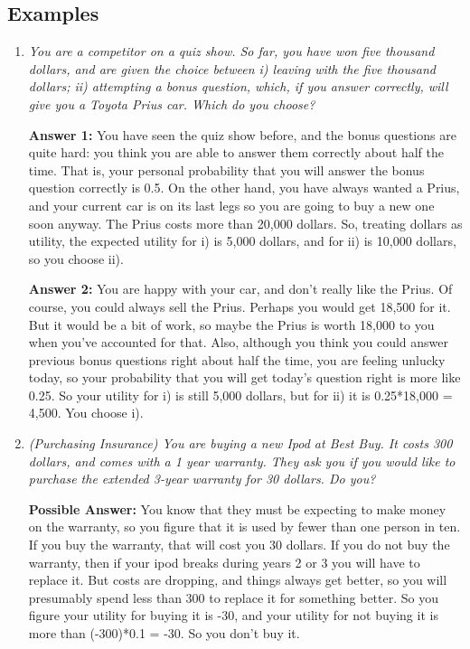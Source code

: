 \documentclass[12pt]{article}
\begin{document}
\subsection{Examples}

\bigskip
\begin{enumerate}

\item {\it You are a competitor on a quiz show. So far, you have won five thousand dollars, and are given the choice between i) leaving with the five thousand dollars; ii) attempting a bonus question, which, if you answer correctly, will give you a Toyota Prius car. Which do you choose?}

{\bf Answer 1:} You have seen the quiz show before, and the bonus questions are quite hard: you think
you are able to answer them correctly about half the time. That is, your personal probability that
you will answer the bonus question correctly is 0.5. On the other hand, you have always wanted
a Prius, and your current car is on its last legs so you are going to buy a new one soon
anyway. The Prius costs more than 20,000 dollars. So, treating dollars as utility, the expected utility
for i) is 5,000 dollars, and for ii) is 10,000 dollars, so you choose ii).

{\bf Answer 2:} You are happy with your car, and don't really like the Prius. Of course, you could always
sell the Prius. Perhaps you would get 18,500 for it. But it would be a bit of work, so maybe
the Prius is worth 18,000 to you when you've accounted for that. Also,
although you think you could answer previous bonus questions right about half the time, you
are feeling unlucky today, so your probability that you will get today's question right is more like 0.25.
So your utility for i) is still 5,000 dollars, but for ii) it is 0.25*18,000 = 4,500. You choose i).

\medskip

\item {\it (Purchasing Insurance) You are buying a new Ipod at Best Buy. It costs 300 dollars,
and comes with a 1 year warranty.
They ask you if you would like to purchase the extended 3-year warranty for 30 dollars. Do you?}

{\bf Possible Answer: } You know that they must be expecting to make money on the warranty, so you figure
that it is used by fewer than one person in ten. If you buy the warranty, that will cost you 30 dollars.
If you do not buy the warranty, then if your ipod breaks during years 2 or 3 you will have to replace
it. But costs are dropping, and things always get better, so you will presumably spend less than 300
to replace it for something better. So you figure your utility for buying it is -30, and your
utility for not buying it is more than (-300)*0.1 = -30. So you don't buy it.


\end{enumerate}
\end{document}
